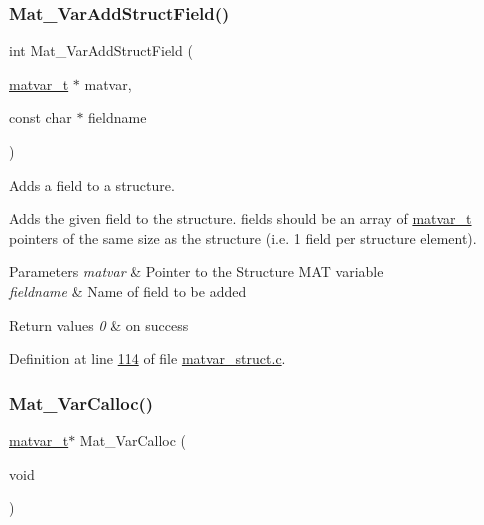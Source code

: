 \subsubsection{\texorpdfstring{Mat\+\_\+\+Var\+Add\+Struct\+Field()}{Mat\_VarAddStructField()}}
{\footnotesize\ttfamily int Mat\+\_\+\+Var\+Add\+Struct\+Field (\begin{DoxyParamCaption}\item[{\hyperlink{group___m_a_t_structmatvar__t}{matvar\+\_\+t} $\ast$}]{matvar,  }\item[{const char $\ast$}]{fieldname }\end{DoxyParamCaption})}



Adds a field to a structure. 

Adds the given field to the structure. fields should be an array of \hyperlink{group___m_a_t_structmatvar__t}{matvar\+\_\+t} pointers of the same size as the structure (i.\+e. 1 field per structure element).


\begin{DoxyParams}{Parameters}
{\em matvar} & Pointer to the Structure M\+AT variable \\
\hline
{\em fieldname} & Name of field to be added \\
\hline
\end{DoxyParams}

\begin{DoxyRetVals}{Return values}
{\em 0} & on success \\
\hline
\end{DoxyRetVals}


Definition at line \hyperlink{matvar__struct_8c_source_l00114}{114} of file \hyperlink{matvar__struct_8c_source}{matvar\+\_\+struct.\+c}.

\mbox{\label{group___m_a_t_gae7c9c3699f6e9c31a9c490300013098c}} 
\subsubsection{\texorpdfstring{Mat\+\_\+\+Var\+Calloc()}{Mat\_VarCalloc()}}
{\footnotesize\ttfamily \hyperlink{group___m_a_t_structmatvar__t}{matvar\+\_\+t}$\ast$ Mat\+\_\+\+Var\+Calloc (\begin{DoxyParamCaption}\item[{void}]{ }\end{DoxyParamCaption})}



